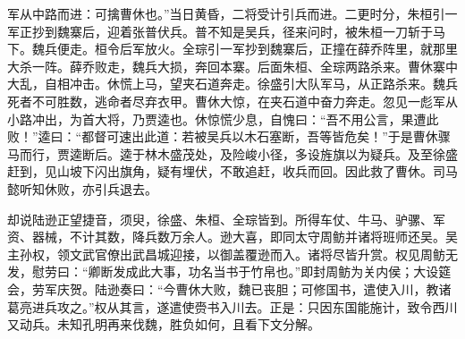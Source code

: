 军从中路而进：可擒曹休也。”当日黄昏，二将受计引兵而进。二更时分，朱桓引一军正抄到魏寨后，迎着张普伏兵。普不知是吴兵，径来问时，被朱桓一刀斩于马下。魏兵便走。桓令后军放火。全琮引一军抄到魏寨后，正撞在薛乔阵里，就那里大杀一阵。薛乔败走，魏兵大损，奔回本寨。后面朱桓、全琮两路杀来。曹休寨中大乱，自相冲击。休慌上马，望夹石道奔走。徐盛引大队军马，从正路杀来。魏兵死者不可胜数，逃命者尽弃衣甲。曹休大惊，在夹石道中奋力奔走。忽见一彪军从小路冲出，为首大将，乃贾逵也。休惊慌少息，自愧曰：“吾不用公言，果遭此败！”逵曰：“都督可速出此道：若被吴兵以木石塞断，吾等皆危矣！”于是曹休骤马而行，贾逵断后。逵于林木盛茂处，及险峻小径，多设旌旗以为疑兵。及至徐盛赶到，见山坡下闪出旗角，疑有埋伏，不敢追赶，收兵而回。因此救了曹休。司马懿听知休败，亦引兵退去。

却说陆逊正望捷音，须臾，徐盛、朱桓、全琮皆到。所得车仗、牛马、驴骡、军资、器械，不计其数，降兵数万余人。逊大喜，即同太守周鲂并诸将班师还吴。吴主孙权，领文武官僚出武昌城迎接，以御盖覆逊而入。诸将尽皆升赏。权见周鲂无发，慰劳曰：“卿断发成此大事，功名当书于竹帛也。”即封周鲂为关内侯；大设筵会，劳军庆贺。陆逊奏曰：“今曹休大败，魏已丧胆；可修国书，遣使入川，教诸葛亮进兵攻之。”权从其言，遂遣使赍书入川去。正是：只因东国能施计，致令西川又动兵。未知孔明再来伐魏，胜负如何，且看下文分解。